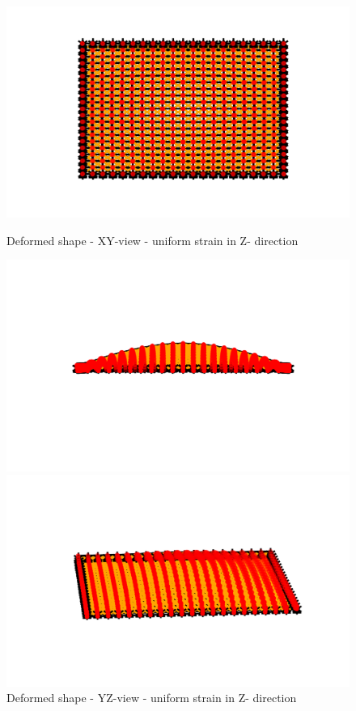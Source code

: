 \begin{figure}[!htbp]
\begin{minipage}{0.3\textwidth}
    \centering
    \includegraphics[width = 1\textwidth]{Figures/Uniform_XY_zz.png}
    \caption{Deformed shape - XY-view - uniform strain in Z- direction}
    \label{fig:uniform_zz_xy}
\end{minipage}
\hspace{5mm}
\begin{minipage}{0.3\textwidth}
    \centering
    \includegraphics[width = 1\textwidth]{Figures/Uniform_YZ_zz.png}
    \caption{Deformed shape - YZ-view - uniform strain in Z- direction}
    \label{fig:uniform_zz_yz}
\end{minipage}
\hspace{5mm}
\begin{minipage}{0.3\textwidth}
    \centering
    \includegraphics[width = 1\textwidth]{Figures/Uniform_3D_zz.png}

\end{minipage}
\end{figure}

